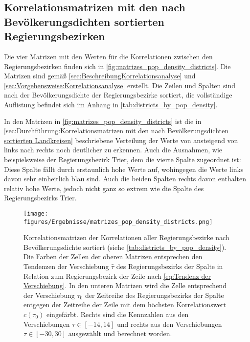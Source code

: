 \subsection{Korrelationsmatrizen mit den nach Bevölkerungsdichten sortierten Regierungsbezirken}\label{sec:Durchführung:Korrelationsmatrizen mit den nach Bevölkerungsdichten sortierten Regierungsbezirken}
Die vier Matrizen mit den Werten für die Korrelationen zwischen den Regierungsbezirken finden sich in \autoref{fig:matrizes_pop_density_districts}. Die Matrizen sind gemäß \autoref{sec:BeschreibungKorrelationsanalyse} und \autoref{sec:Vorgehensweise:Korrelationsanalyse} erstellt. Die Zeilen und Spalten sind nach der Bevölkerungsdichte der Regierungsbezirke sortiert, die vollständige Auflistung befindet sich im Anhang in \autoref{tab:districts_by_pop_density}.

In den Matrizen in \autoref{fig:matrizes_pop_density_districts} ist die in \autoref{sec:Durchführung:Korrelationsmatrizen mit den nach Bevölkerungsdichten sortierten Landkreisen} beschriebene Verteilung der Werte von ansteigend von links nach rechts noch deutlicher zu erkennen. Auch die Ausnahmen, wie beispielsweise der Regierungsbezirk Trier, dem die vierte Spalte zugeordnet ist: Diese Spalte fällt durch erstaunlich hohe Werte auf, wohingegen die Werte links davon sehr einheitlich blau sind. Auch die beiden Spalten rechts davon enthalten relativ hohe Werte, jedoch nicht ganz so extrem wie die Spalte des Regierungsbezirks Trier.
\begin{figure}[H]
    \centering
    \texttt{[image: figures/Ergebnisse/matrizes\_pop\_density\_districts.png]}
    \caption{Korrelationsmatrizen der Korrelationen aller Regierungsbezirke nach Bevölkerungsdichte sortiert (siehe \autoref{tab:districts_by_pop_density}). Die Farben der Zellen der oberen Matrizen entsprechen den Tendenzen der Verschiebung $\hat{\tau}$ des Regierungsbezirks der Spalte in Relation zum Regierungsbezirk der Zeile nach \autoref{eq:Tendenz der Verschiebung}. 
    In den unteren Matrizen wird die Zelle entsprechend der Verschiebung $\tau_0$ der Zeitreihe des Regierungsbezirks der Spalte entgegen der Zeitreihe der Zeile mit dem höchsten Korrelationswert $c(\tau_0)$ eingefärbt. Rechts sind die Kennzahlen aus den Verschiebungen $\tau\in[-14,14]$ und rechts aus den Verschiebungen $\tau\in[-30,30]$ ausgewählt und berechnet worden.}
    \label{fig:matrizes_pop_density_districts}
\end{figure}

